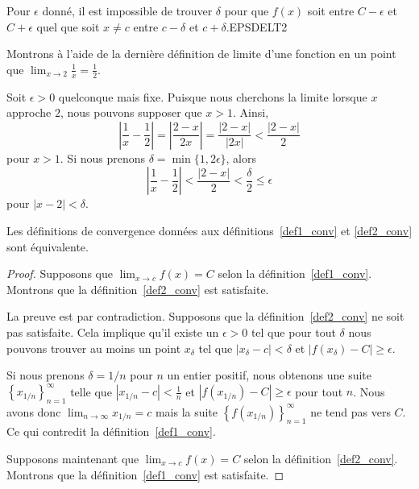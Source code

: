 {
{Pour $\epsilon$ donné, il est impossible de trouver $\delta$ pour que
$f(x)$ soit entre $C-\epsilon$ et $C+\epsilon$ quel que soit $x \neq c$
entre $c-\delta$ et $c+\delta$.}{EPSDELT2}

\begin{egg}
Montrons à l'aide de la dernière définition de limite d'une fonction
en un point que
$\displaystyle \lim_{x\rightarrow 2} \frac{1}{x} = \frac{1}{2}$.

Soit $\epsilon >0$ quelconque mais fixe.  Puisque nous cherchons la
limite lorsque $x$ approche $2$, nous pouvons supposer que $x>1$.
Ainsi,
\[ 
\left|\frac{1}{x} - \frac{1}{2}\right| = \left| \frac{2-x}{2x} \right|
= \frac{|2-x|}{|2x|} < \frac{|2-x|}{2}
\]
pour $x>1$.  Si nous prenons $\delta = \min\{1, 2\epsilon\}$, alors
\[
\left|\frac{1}{x} - \frac{1}{2}\right| < \frac{|2-x|}{2}
< \frac{\delta}{2} \leq \epsilon
\]
pour $|x-2|<\delta$.
\end{egg}

\begin{focus}{\prp}
Les définitions de convergence données aux définitions~\ref{def1_conv}
et \ref{def2_conv} sont équivalente.
\end{focus}

\begin{proof}
 Supposons que $\displaystyle \lim_{x\rightarrow c} f(x) = C$
selon la définition~\ref{def1_conv}.  Montrons que la
définition~\ref{def2_conv} est satisfaite.

La preuve est par contradiction.  Supposons que la
définition~\ref{def2_conv} ne soit pas satisfaite.  Cela implique
qu'il existe un $\epsilon >0$ tel que pour tout $\delta$ nous pouvons
trouver au moins un point $x_\delta$ tel que
$\displaystyle \left|x_\delta -c\right| < \delta$ et
$\displaystyle \left|f(x_\delta) -C\right| \geq \epsilon$.

Si nous prenons $\delta = 1/n$ pour $n$ un entier positif, nous
obtenons une
suite $\displaystyle \left\{ x_{1/n} \right\}_{n=1}^\infty$ telle que
$\displaystyle \left|x_{1/n} - c \right| < \frac{1}{n}$ et
$\displaystyle \left|f(x_{1/n}) -C\right| \geq \epsilon$ pour tout $n$.
Nous avons donc $\displaystyle \lim_{n\rightarrow \infty} x_{1/n} = c$ mais
la suite $\displaystyle \left\{ f(x_{1/n}) \right\}_{n=1}^\infty$ ne
tend pas vers $C$.  Ce qui contredit la définition~\ref{def1_conv}.

 Supposons maintenant que
$\displaystyle \lim_{x\rightarrow c} f(x) = C$ selon la
définition~\ref{def2_conv}.  Montrons que la
définition~\ref{def1_conv} est satisfaite.


\end{proof}}
